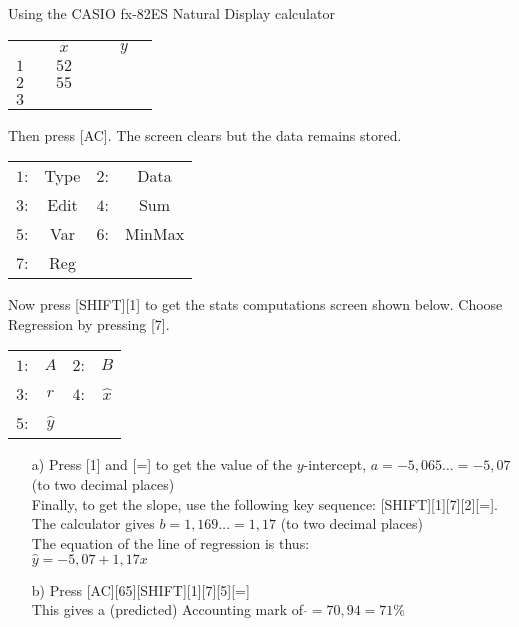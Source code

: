 \begin{wex}{Using the CASIO fx-82ES Natural Display calculator}
{\begin{center}
\begin{tabular}{c|c c c|c c c}
 & & $x$ & & & $y$ &\\
$1$& & $52$ & & & & \\
$2$& & $55$ & & & & \\
$3$& & & & & & \\
\end{tabular}
\end{center}

Then press [AC]. The screen clears but the data remains stored.

\begin{center}
\begin{tabular}{|c c c c|}\hline
$1$: & Type & $2$: & Data \\
$3$: & Edit & $4$: & Sum \\
$5$: & Var & $6$: & MinMax \\
$7$: & Reg &  &  \\\hline
\end{tabular}
\end{center}

Now press [SHIFT][1] to get the stats computations screen shown below. Choose Regression by pressing [7].

\begin{center}
\begin{tabular}{|c c c c|}\hline
$1$: & $A$ & $2$: & $B$ \\
$3$: & $r$ & $4$: & $\hat{x}$ \\
$5$: & $\hat{y}$ & & \\ \hline
\end{tabular}
\end{center}

\begin{enumerate}
\item[a)] Press [1] and [=] to get the value of the $y$-intercept, $a = -5,065\ldots= -5,07 $ (to two decimal places)\\
Finally, to get the slope, use the following key sequence: [SHIFT][1][7][2][=]. The calculator gives $b = 1,169\ldots = 1,17$ (to two decimal places)\\

The equation of the line of regression is thus:\\
$\hat{y} =-5,07  + 1,17 x$\\

\item[b)] Press [AC][65][SHIFT][1][7][5][=]\\
 This gives a (predicted) Accounting mark of $\hat{} = 70,94 = 71\%$
\end{enumerate}
}
\end{wex}

